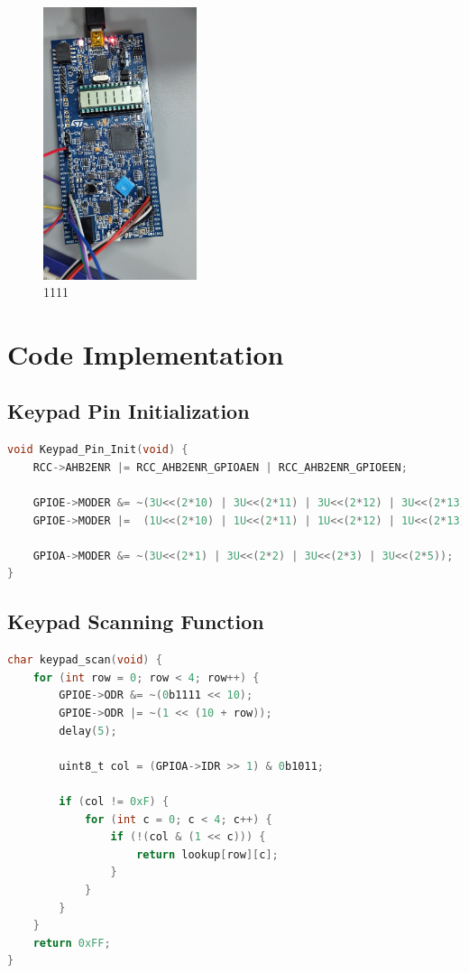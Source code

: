 \documentclass[12pt]{article}
\begin{document}
\begin{figure}[H]
    \centering
    \includegraphics[width=0.4\textwidth]{1111.jpg}
    \caption{1111}
\end{figure}




\section{Code Implementation}

\subsection{Keypad Pin Initialization}
\begin{lstlisting}[language=C, caption={Keypad Pin Initialization}]
void Keypad_Pin_Init(void) {
    RCC->AHB2ENR |= RCC_AHB2ENR_GPIOAEN | RCC_AHB2ENR_GPIOEEN;

    GPIOE->MODER &= ~(3U<<(2*10) | 3U<<(2*11) | 3U<<(2*12) | 3U<<(2*13));
    GPIOE->MODER |=  (1U<<(2*10) | 1U<<(2*11) | 1U<<(2*12) | 1U<<(2*13));

    GPIOA->MODER &= ~(3U<<(2*1) | 3U<<(2*2) | 3U<<(2*3) | 3U<<(2*5));
}
\end{lstlisting}

\subsection{Keypad Scanning Function}
\begin{lstlisting}[language=C, caption={Keypad Scanning}]
char keypad_scan(void) {
    for (int row = 0; row < 4; row++) {
        GPIOE->ODR &= ~(0b1111 << 10);
        GPIOE->ODR |= ~(1 << (10 + row));
        delay(5);

        uint8_t col = (GPIOA->IDR >> 1) & 0b1011;

        if (col != 0xF) {
            for (int c = 0; c < 4; c++) {
                if (!(col & (1 << c))) {
                    return lookup[row][c]; 
                }
            }
        }
    }
    return 0xFF; 
}
\end{lstlisting}
\newpage
\end{document}
